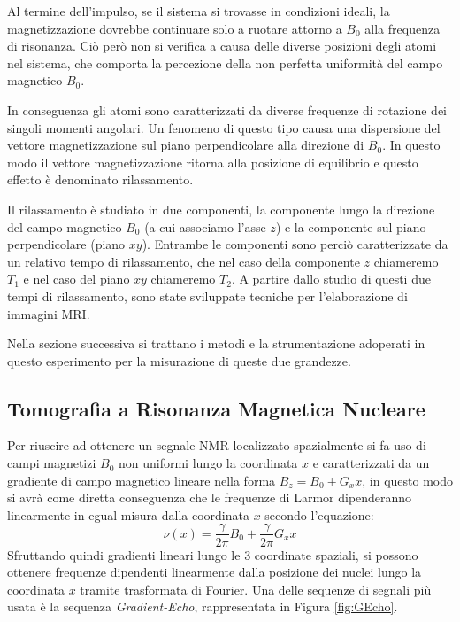 Al termine dell'impulso, se il sistema si trovasse in condizioni ideali, la magnetizzazione dovrebbe continuare solo a ruotare attorno a $B_0$ alla frequenza di risonanza. 
Ciò però non si verifica a causa delle diverse posizioni degli atomi nel sistema, che comporta la percezione della non perfetta uniformità del campo magnetico $B_0$. 

In conseguenza gli atomi sono caratterizzati da diverse frequenze di rotazione dei singoli momenti angolari.
Un fenomeno di questo tipo causa una dispersione del vettore magnetizzazione sul piano perpendicolare alla direzione di $B_0$.
In questo modo il vettore magnetizzazione ritorna alla posizione di equilibrio e questo effetto è denominato rilassamento.

Il rilassamento è studiato in due componenti, la componente lungo la direzione del campo magnetico $B_0$ (a cui associamo l'asse $z$) e la componente sul piano perpendicolare (piano $xy$). 
Entrambe le componenti sono perciò caratterizzate da un relativo tempo di rilassamento, che nel caso della componente $z$ chiameremo $T_1$ e nel caso del piano $xy$ chiameremo $T_2$.
A partire dallo studio di questi due tempi di rilassamento, sono state sviluppate tecniche per l'elaborazione di immagini MRI.

Nella sezione successiva si trattano i metodi e la strumentazione adoperati in questo esperimento per la misurazione di queste due grandezze.

\subsection*{Tomografia a Risonanza Magnetica Nucleare}

Per riuscire ad ottenere un segnale NMR localizzato spazialmente si fa uso di campi magnetizi $B_0$ non uniformi lungo la coordinata $x$ e caratterizzati da un gradiente di campo magnetico lineare nella forma $B_z = B_0 + G_x x$, in questo modo si avrà come diretta conseguenza che le frequenze di Larmor dipenderanno linearmente in egual misura dalla coordinata $x$ secondo l'equazione:
\begin{equation}
	\nu(x) = \frac{\gamma}{2\pi}B_0 + \frac{\gamma}{2\pi}G_x x
\end{equation}
Sfruttando quindi gradienti lineari lungo le 3 coordinate spaziali, si possono ottenere frequenze dipendenti linearmente dalla posizione dei nuclei lungo la coordinata $x$ tramite trasformata di Fourier. Una delle sequenze di segnali più usata è la sequenza \textit{Gradient-Echo}, rappresentata in Figura \ref{fig:GEcho}.

